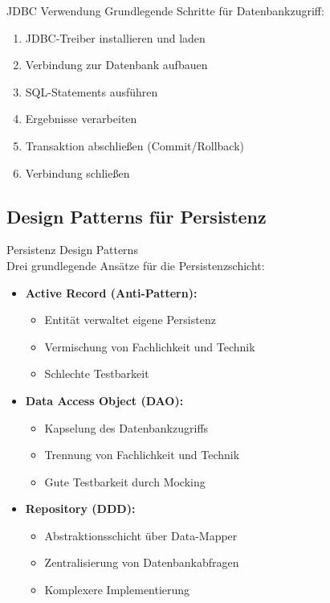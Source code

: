 \begin{KR}{JDBC Verwendung}
Grundlegende Schritte für Datenbankzugriff:
\begin{enumerate}
    \item JDBC-Treiber installieren und laden
    \item Verbindung zur Datenbank aufbauen
    \item SQL-Statements ausführen
    \item Ergebnisse verarbeiten
    \item Transaktion abschließen (Commit/Rollback)
    \item Verbindung schließen
\end{enumerate}
\end{KR}



\subsection{Design Patterns für Persistenz}

\begin{theorem}{Persistenz Design Patterns}\\
Drei grundlegende Ansätze für die Persistenzschicht:
\begin{itemize}
    \item \textbf{Active Record (Anti-Pattern):}
    \begin{itemize}
        \item Entität verwaltet eigene Persistenz
        \item Vermischung von Fachlichkeit und Technik
        \item Schlechte Testbarkeit
    \end{itemize}
    \item \textbf{Data Access Object (DAO):}
    \begin{itemize}
        \item Kapselung des Datenbankzugriffs
        \item Trennung von Fachlichkeit und Technik
        \item Gute Testbarkeit durch Mocking
    \end{itemize}
    \item \textbf{Repository (DDD):}
    \begin{itemize}
        \item Abstraktionsschicht über Data-Mapper
        \item Zentralisierung von Datenbankabfragen
        \item Komplexere Implementierung
    \end{itemize}
\end{itemize}
\end{theorem}


